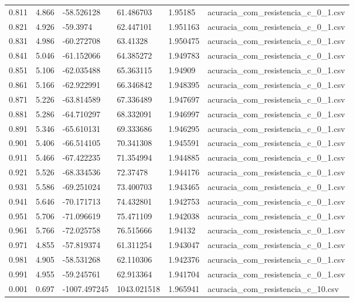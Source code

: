 \begin{table}
\begin{tabular}{llllll}
0.811 & 4.866 & -58.526128 & 61.486703 & 1.95185 & acuracia\_com\_resistencia\_c\_0\_1.csv \\
0.821 & 4.926 & -59.3974 & 62.447101 & 1.951163 & acuracia\_com\_resistencia\_c\_0\_1.csv \\
0.831 & 4.986 & -60.272708 & 63.41328 & 1.950475 & acuracia\_com\_resistencia\_c\_0\_1.csv \\
0.841 & 5.046 & -61.152066 & 64.385272 & 1.949783 & acuracia\_com\_resistencia\_c\_0\_1.csv \\
0.851 & 5.106 & -62.035488 & 65.363115 & 1.94909 & acuracia\_com\_resistencia\_c\_0\_1.csv \\
0.861 & 5.166 & -62.922991 & 66.346842 & 1.948395 & acuracia\_com\_resistencia\_c\_0\_1.csv \\
0.871 & 5.226 & -63.814589 & 67.336489 & 1.947697 & acuracia\_com\_resistencia\_c\_0\_1.csv \\
0.881 & 5.286 & -64.710297 & 68.332091 & 1.946997 & acuracia\_com\_resistencia\_c\_0\_1.csv \\
0.891 & 5.346 & -65.610131 & 69.333686 & 1.946295 & acuracia\_com\_resistencia\_c\_0\_1.csv \\
0.901 & 5.406 & -66.514105 & 70.341308 & 1.945591 & acuracia\_com\_resistencia\_c\_0\_1.csv \\
0.911 & 5.466 & -67.422235 & 71.354994 & 1.944885 & acuracia\_com\_resistencia\_c\_0\_1.csv \\
0.921 & 5.526 & -68.334536 & 72.37478 & 1.944176 & acuracia\_com\_resistencia\_c\_0\_1.csv \\
0.931 & 5.586 & -69.251024 & 73.400703 & 1.943465 & acuracia\_com\_resistencia\_c\_0\_1.csv \\
0.941 & 5.646 & -70.171713 & 74.432801 & 1.942753 & acuracia\_com\_resistencia\_c\_0\_1.csv \\
0.951 & 5.706 & -71.096619 & 75.471109 & 1.942038 & acuracia\_com\_resistencia\_c\_0\_1.csv \\
0.961 & 5.766 & -72.025758 & 76.515666 & 1.94132 & acuracia\_com\_resistencia\_c\_0\_1.csv \\
0.971 & 4.855 & -57.819374 & 61.311254 & 1.943047 & acuracia\_com\_resistencia\_c\_0\_1.csv \\
0.981 & 4.905 & -58.531268 & 62.110306 & 1.942376 & acuracia\_com\_resistencia\_c\_0\_1.csv \\
0.991 & 4.955 & -59.245761 & 62.913364 & 1.941704 & acuracia\_com\_resistencia\_c\_0\_1.csv \\
0.001 & 0.697 & -1007.497245 & 1043.021518 & 1.965941 & acuracia\_com\_resistencia\_c\_10.csv \\

\end{tabular}
\end{table}
